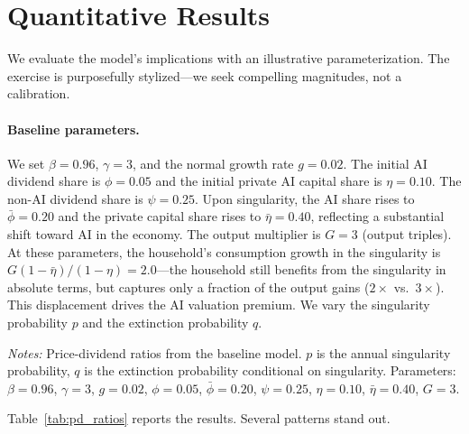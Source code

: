 \documentclass[12pt]{article}
\begin{document}
\section{Quantitative Results}

We evaluate the model's implications with an illustrative parameterization. The exercise is purposefully stylized---we seek compelling magnitudes, not a calibration.

\paragraph{Baseline parameters.} We set $\beta = 0.96$, $\gamma = 3$, and the normal growth rate $g = 0.02$. The initial AI dividend share is $\phi = 0.05$ and the initial private AI capital share is $\eta = 0.10$. The non-AI dividend share is $\psi = 0.25$. Upon singularity, the AI share rises to $\bar{\phi} = 0.20$ and the private capital share rises to $\bar{\eta} = 0.40$, reflecting a substantial shift toward AI in the economy. The output multiplier is $G = 3$ (output triples). At these parameters, the household's consumption growth in the singularity is $G(1 - \bar{\eta})/(1 - \eta) = 2.0$---the household still benefits from the singularity in absolute terms, but captures only a fraction of the output gains ($2\times$ vs.\ $3\times$). This displacement drives the AI valuation premium. We vary the singularity probability $p$ and the extinction probability $q$.

\begin{table}[t]
\centering
\caption{Price-dividend ratios: AI stocks vs.\ non-AI stocks}
\label{tab:pd_ratios} %

\begin{minipage}{0.9\textwidth}
\vspace{6pt}
\footnotesize
\emph{Notes:} Price-dividend ratios from the baseline model. $p$ is the annual singularity probability, $q$ is the extinction probability conditional on singularity. Parameters: $\beta = 0.96$, $\gamma = 3$, $g = 0.02$, $\phi = 0.05$, $\bar{\phi} = 0.20$, $\psi = 0.25$, $\eta = 0.10$, $\bar{\eta} = 0.40$, $G = 3$.
\end{minipage}
\end{table}

Table~\ref{tab:pd_ratios} reports the results. Several patterns stand out.
\end{document}
